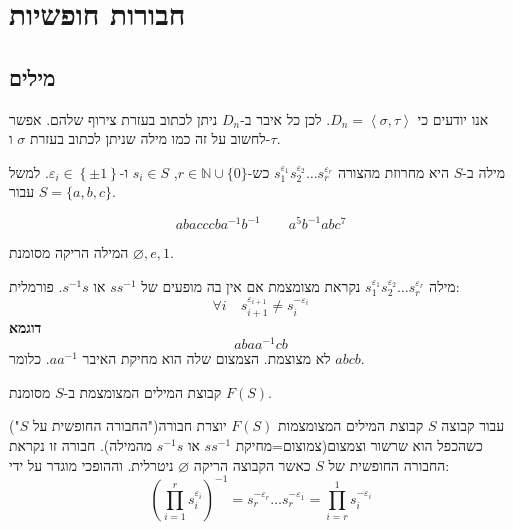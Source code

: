 \documentclass{tstextbook}
\begin{document}
\chapter{חבורות חופשיות}

\section{מילים}

אנו יודעים כי \(D_{n}=\left\langle  \sigma,\tau \right\rangle\). לכן כל איבר ב-\(D_{n}\) ניתן לכתוב בעזרת צירוף שלהם. אפשר לחשוב על זה כמו מילה שניתן לכתוב בעזרת \(\sigma\) ו-\(\tau\).

\begin{definition}
מילה ב-\(S\) היא מחרוזת מהצורה \(s_{1}^{\varepsilon_{1}} s_{2}^{\varepsilon_{2}} \dots s_{r}^{\varepsilon_{r}}\) כש-\(r\in \mathbb{N} \cup \{ 0 \}\), \(s_{i}\in S\) ו-\(\varepsilon_{i}\in \left\{  \pm 1  \right\}\). למשל עבור \(S=\{ a,b,c \}\).

\end{definition}
\begin{example}
$$abacccba^{-1} b^{-1} \qquad a^5b^{-1} abc^7$$

\end{example}
\begin{symbolize}
המילה הריקה מסומנת \(\varnothing,e,1\).

\end{symbolize}
\begin{definition}
מילה \(s_{1}^{\varepsilon_{1}} s_{2}^{\varepsilon_{2}} \dots s_{r}^{\varepsilon_{r}}\) נקראת מצומצמת אם אין בה מופעים של \(ss ^{-1}\) או \(s ^{-1} s\). פורמלית:
$$\forall i\quad s_{i+1}^{\varepsilon_{i+1}}\neq s_{i}^{-\varepsilon_{i}}$$\textbf{דוגמא}$$abaa ^{-1} cb$$
לא מצוצמת. הצמצום שלה הוא מחיקת האיבר \(aa^{-1}\). כלומר \(abcb\).

\end{definition}
\begin{definition}
קבוצת המילים המצומצמת ב-\(S\) מסומנת \(F(S)\). 

\end{definition}
\begin{proposition}
עבור קבוצה \(S\) קבוצת המילים המצומצמות \(F(S)\) יוצרת חבורה("החבורה החופשית על \(S\)") כשהכפל הוא שרשור וצמצום(צמוצום=מחיקת \(ss^{-1}\) או \(s ^{-1} s\) מהמילה). חבורה זו נקראת החבורה החופשית של \(S\) כאשר הקבוצה הריקה \(\varnothing\) ניטרלית. וההופכי מוגדר על ידי:
$$\left( \prod_{i=1}^r s_{i}^{\varepsilon_{i}} \right)^{-1} = s_{r}^{-\varepsilon_{r}}\dots s_{r}^{-\varepsilon _{1}}=\prod_{i=r}^1 s_{i}^{-\varepsilon_{i}}$$

\end{proposition}
\end{document}
